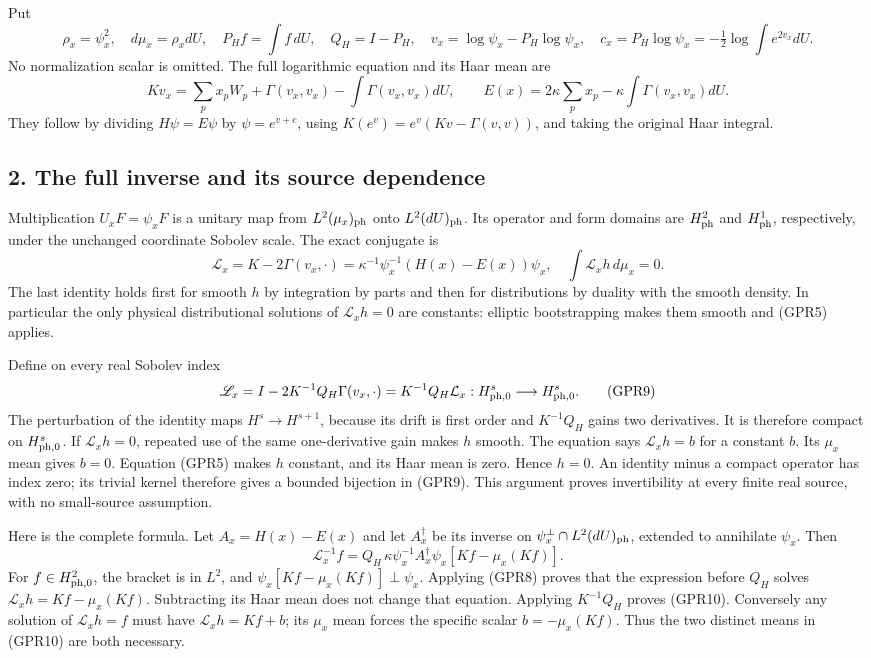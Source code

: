 \documentclass[11pt]{article}
\begin{document}
Put
\[
 \rho_x=\psi_x^2,\quad d\mu_x=\rho_xdU,\quad
 P_Hf=\int f\,dU,\quad Q_H=I-P_H,\quad
 v_x=\log\psi_x-P_H\log\psi_x,\quad
 c_x=P_H\log\psi_x=-\tfrac12\log\int e^{2v_x}dU.
 \tag{GPR6}
\]
No normalization scalar is omitted. The full logarithmic equation and its Haar mean are
\[
 Kv_x=\sum_p x_pW_p+\Gamma(v_x,v_x)-\int\Gamma(v_x,v_x)dU,
 \qquad
 E(x)=2\kappa\sum_p x_p-\kappa\int\Gamma(v_x,v_x)dU.
 \tag{GPR7}
\]
They follow by dividing \(H\psi=E\psi\) by \(\psi=e^{v+c}\), using \(K(e^v)=e^v(Kv-\Gamma(v,v))\), and taking the original Haar integral.

\subsection*{2. The full inverse and its source dependence}

Multiplication \(U_xF=\psi_xF\) is a unitary map from \(L^2(\mu_x)_{\rm ph}\) onto \(L^2(dU)_{\rm ph}\). Its operator and form domains are \(H^2_{\rm ph}\) and \(H^1_{\rm ph}\), respectively, under the unchanged coordinate Sobolev scale. The exact conjugate is
\[
 \mathcal L_x=K-2\Gamma(v_x,\cdot)
 =\kappa^{-1}\psi_x^{-1}(H(x)-E(x))\psi_x,
 \quad
 \int\mathcal L_xh\,d\mu_x=0.
 \tag{GPR8}
\]
The last identity holds first for smooth \(h\) by integration by parts and then for distributions by duality with the smooth density. In particular the only physical distributional solutions of \(\mathcal L_xh=0\) are constants: elliptic bootstrapping makes them smooth and (GPR5) applies.

Define on every real Sobolev index
\[
 \mathscr L_x
 =I-2K^{-1}Q_H\Gamma(v_x,\cdot)
 =K^{-1}Q_H\mathcal L_x:
 H^s_{\rm ph,0}\longrightarrow H^s_{\rm ph,0}.
 \tag{GPR9}
\]
The perturbation of the identity maps \(H^s\to H^{s+1}\), because its drift is first order and \(K^{-1}Q_H\) gains two derivatives. It is therefore compact on \(H^s_{\rm ph,0}\). If \(\mathscr L_xh=0\), repeated use of the same one-derivative gain makes \(h\) smooth. The equation says \(\mathcal L_xh=b\) for a constant \(b\). Its \(\mu_x\) mean gives \(b=0\). Equation (GPR5) makes \(h\) constant, and its Haar mean is zero. Hence \(h=0\). An identity minus a compact operator has index zero; its trivial kernel therefore gives a bounded bijection in (GPR9). This argument proves invertibility at every finite real source, with no small-source assumption.

Here is the complete formula. Let \(A_x=H(x)-E(x)\) and let \(A_x^\dagger\) be its inverse on \(\psi_x^\perp\cap L^2(dU)_{\rm ph}\), extended to annihilate \(\psi_x\). Then
\[
 \boxed{
 \mathscr L_x^{-1}f
 =Q_H\,\kappa\psi_x^{-1}A_x^\dagger\psi_x
       [Kf-\mu_x(Kf)] .}
 \tag{GPR10}
\]
For \(f\in H^2_{\rm ph,0}\), the bracket is in \(L^2\), and \(\psi_x[Kf-\mu_x(Kf)]\perp\psi_x\). Applying (GPR8) proves that the expression before \(Q_H\) solves \(\mathcal L_xh=Kf-\mu_x(Kf)\). Subtracting its Haar mean does not change that equation. Applying \(K^{-1}Q_H\) proves (GPR10). Conversely any solution of \(\mathscr L_xh=f\) must have \(\mathcal L_xh=Kf+b\); its \(\mu_x\) mean forces the specific scalar \(b=-\mu_x(Kf)\). Thus the two distinct means in (GPR10) are both necessary.
\end{document}
